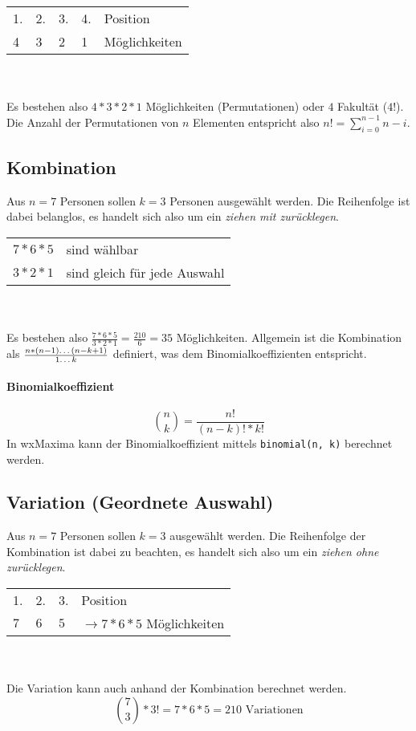 \documentclass{school}
\begin{document}
{\small \begin{tabular}{l l l l l}
1. & 2. & 3. & 4. & Position\\
4 & 3 & 2 & 1 & Möglichkeiten
\end{tabular}}
\\\\
Es bestehen also $4 * 3 * 2 * 1$ Möglichkeiten (Permutationen) oder $4$ Fakultät ($4!$).\\
Die Anzahl der Permutationen von $n$ Elementen entspricht also $n! = \sum_{i=0}^{n - 1} n-i$.

\subsection{Kombination}
Aus $n=7$ Personen sollen $k=3$ Personen ausgewählt werden. Die Reihenfolge ist dabei belanglos, es handelt sich also um ein \textit{ziehen mit zurücklegen}.

{\small \begin{tabular}{l l}
$7 * 6 * 5$ & sind wählbar\\
$3 * 2 * 1$ & sind gleich für jede Auswahl
\end{tabular}}
\\\\
Es bestehen also $\frac{7 * 6 * 5}{3 * 2 * 1} = \frac{210}{6} = 35$ Möglichkeiten.
Allgemein ist die Kombination als $\frac{n * (n-1) \text{\dots} (n - k + 1)}{1 \text{\dots} k}$ definiert, was dem Binomialkoeffizienten entspricht.

\paragraph{Binomialkoeffizient}
$$\binom{n}{k} = \frac{n!}{(n-k)! * k!}$$
In wxMaxima kann der Binomialkoeffizient mittels \verb|binomial(n, k)| berechnet werden.

\subsection{Variation \normalsize{(Geordnete Auswahl)}}
Aus $n=7$ Personen sollen $k=3$ ausgewählt werden. Die Reihenfolge der Kombination ist dabei zu beachten, es handelt sich also um ein \textit{ziehen ohne zurücklegen}.

{\small \begin{tabular}{l l l l}
1. & 2. & 3. & Position\\
$7$ & $6$ & $5$ & $\rightarrow 7 * 6 * 5$ Möglichkeiten
\end{tabular}}
\\\\
Die Variation kann auch anhand der Kombination berechnet werden.
$$\binom{7}{3} * 3! = 7 * 6 * 5 = 210 \text{~Variationen}$$
\end{document}

